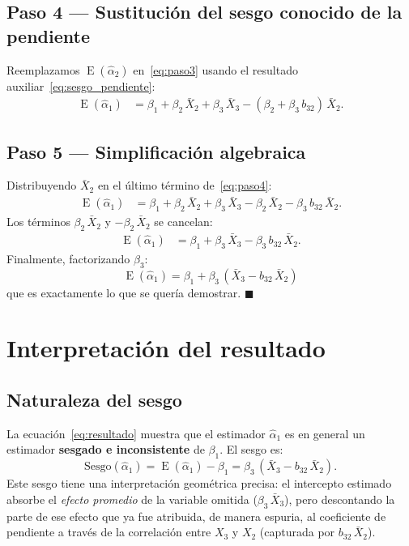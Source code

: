 \documentclass[12pt, letterpaper]{article}
\newcommand{\E}{\operatorname{E}}
\begin{document}
\subsection{Paso 4 --- Sustitución del sesgo conocido de la pendiente}

Reemplazamos $\E(\hat{\alpha}_2)$ en~\eqref{eq:paso3} usando el
resultado auxiliar~\eqref{eq:sesgo_pendiente}:
\begin{align}
  \E(\hat{\alpha}_1)
  &= \beta_1 + \beta_2\,\bar{X}_2 + \beta_3\,\bar{X}_3
     - (\beta_2 + \beta_3\,b_{32})\,\bar{X}_2.
  \label{eq:paso4}
\end{align}

\subsection{Paso 5 --- Simplificación algebraica}

Distribuyendo $\bar{X}_2$ en el último término de~\eqref{eq:paso4}:
\begin{align}
  \E(\hat{\alpha}_1)
  &= \beta_1
     + \beta_2\,\bar{X}_2
     + \beta_3\,\bar{X}_3
     - \beta_2\,\bar{X}_2
     - \beta_3\,b_{32}\,\bar{X}_2.
  \label{eq:paso5a}
\end{align}
Los términos $\beta_2\,\bar{X}_2$ y $-\beta_2\,\bar{X}_2$ se cancelan:
\begin{align}
  \E(\hat{\alpha}_1)
  &= \beta_1 + \beta_3\,\bar{X}_3 - \beta_3\,b_{32}\,\bar{X}_2.
  \label{eq:paso5b}
\end{align}
Finalmente, factorizando $\beta_3$:
\begin{equation}
  \boxed{
    \E(\hat{\alpha}_1) = \beta_1 + \beta_3\,(\bar{X}_3 - b_{32}\,\bar{X}_2)
  }
  \label{eq:resultado}
\end{equation}
que es exactamente lo que se quería demostrar. \hfill $\blacksquare$

\section{Interpretación del resultado}

\subsection{Naturaleza del sesgo}

La ecuación~\eqref{eq:resultado} muestra que el estimador $\hat{\alpha}_1$
es en general un estimador \textbf{sesgado e inconsistente} de $\beta_1$.
El sesgo es:
\begin{equation}
  \text{Sesgo}(\hat{\alpha}_1)
  = \E(\hat{\alpha}_1) - \beta_1
  = \beta_3\,(\bar{X}_3 - b_{32}\,\bar{X}_2).
  \label{eq:sesgo}
\end{equation}
Este sesgo tiene una interpretación geométrica precisa: el intercepto
estimado absorbe el \emph{efecto promedio} de la variable omitida
($\beta_3\,\bar{X}_3$), pero descontando la parte de ese efecto que ya
fue atribuida, de manera espuria, al coeficiente de pendiente a través
de la correlación entre $X_3$ y $X_2$ (capturada por $b_{32}\,\bar{X}_2$).
\end{document}
